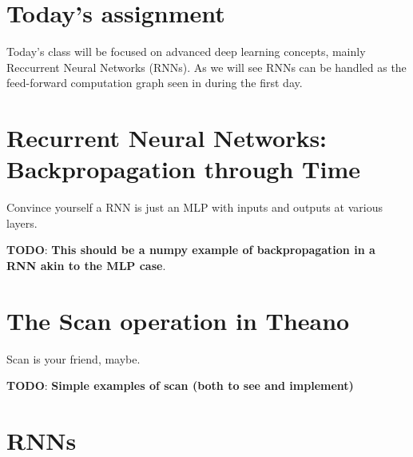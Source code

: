 \section{Today's assignment}
Today's class will be focused on advanced deep learning concepts, mainly
Reccurrent Neural Networks (RNNs). As we will see RNNs can be handled as the
feed-forward computation graph seen in during the first day. 

\section{Recurrent Neural Networks: Backpropagation through Time}

\begin{exercise}
Convince yourself a RNN is just an MLP with inputs and outputs at various
layers. 

\textbf{TODO}:
\textbf{This should be a numpy example of backpropagation in a RNN akin to the MLP case}.
 
\end{exercise}

\section{The Scan operation in Theano}

\begin{exercise}
Scan is your friend, maybe. 

\textbf{TODO}:
\textbf{Simple examples of scan (both to see and implement)}
\end{exercise}

\section{RNNs}

